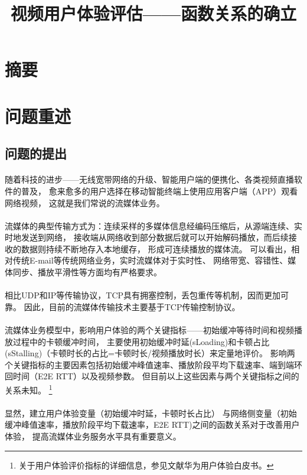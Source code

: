 \documentclass[UTF8]{ctexart}
\title{视频用户体验评估——函数关系的确立}
\begin{document}
\maketitle
\section{摘要}
\section{问题重述}
\subsection{问题的提出}
\paragraph{}
随着科技的进步——无线宽带网络的升级、智能用户端的便携化、各类视频直播软件的普及，
愈来愈多的用户选择在移动智能终端上使用应用客户端（APP）观看网络视频，
这就是我们常说的流媒体业务。
\paragraph{}
流媒体的典型传输方式为：连续采样的多媒体信息经编码压缩后，从源端连续、实时地发送到网络， 
接收端从网络收到部分数据后就可以开始解码播放，而后续接 收的数据则持续不断地存入本地缓存，
形成可连续播放的媒体流。
可以看出，相对传统E-mail等传统网络业务，实时流媒体对于实时性、 网络带宽、容错性、媒体同步、播放平滑性等方面均有严格要求。
\paragraph{}
相比UDP和IP等传输协议，TCP具有拥塞控制，丢包重传等机制，因而更加可靠。
因此，目前的流媒体传输技术主要基于TCP传输控制协议。
\paragraph{}
流媒体业务模型中，影响用户体验的两个关键指标——初始缓冲等待时间和视频播放过程中的卡顿缓冲时间，
主要使用初始缓冲时延(sLoading)和卡顿占比(sStalling)（卡顿时长的占比=卡顿时长/视频播放时长）来定量地评价。
影响两个关键指标的主要因素包括初始缓冲峰值速率、播放阶段平均下载速率、端到端环回时间（E2E RTT）以及视频参数。
但目前以上这些因素与两个关键指标之间的关系未知。
\footnote{关于用户体验评价指标的详细信息，参见文献\cite{}华为用户体验白皮书。}
\paragraph{}
显然，建立用户体验变量（初始缓冲时延，卡顿时长占比）
与网络侧变量（初始缓冲峰值速率，播放阶段平均下载速率，E2E RTT)之间的函数关系对于改善用户体验，
提高流媒体业务服务水平具有重要意义。
\end{document}
